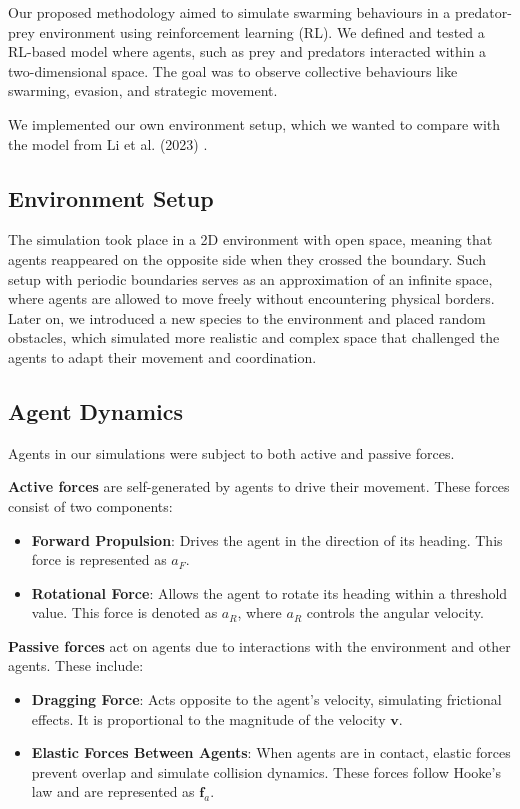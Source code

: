 \documentclass[9pt]{pnas-new}
\renewcommand{\vec}[1]{\ensuremath{\mathbf{#1}}}
\begin{document}
Our proposed methodology aimed to simulate swarming behaviours in a predator-prey environment using reinforcement learning (RL). 
We defined and tested a RL-based model where agents, such as prey and predators interacted within a two-dimensional space. The goal was to observe collective behaviours like swarming, evasion, and strategic movement.

We implemented our own environment setup, which we wanted to compare with the model from Li et al. (2023) \cite{li2023predator}.

\subsection{Environment Setup}
The simulation took place in a 2D environment with open space, meaning that agents reappeared on the opposite side when they crossed the boundary.
Such setup with periodic boundaries serves as an approximation of an infinite space, where agents are allowed to move freely without encountering physical borders. 
Later on, we introduced a new species to the environment and placed random obstacles, which simulated more realistic and complex space that challenged the agents to adapt their movement and coordination. 

\subsection{Agent Dynamics}
Agents in our simulations were subject to both active and passive forces.

\textbf{Active forces} are self-generated by agents to drive their movement. These forces consist of two components:
\begin{itemize}
	\item \textbf{Forward Propulsion}: Drives the agent in the direction of its heading. This force is represented as \( a_F \).
	\item \textbf{Rotational Force}: Allows the agent to rotate its heading within a threshold value. This force is denoted as \( a_R \), where \( a_R \) controls the angular velocity.
\end{itemize}

\textbf{Passive forces} act on agents due to interactions with the environment and other agents. These include:
\begin{itemize}
	\item \textbf{Dragging Force}: Acts opposite to the agent's velocity, simulating frictional effects. It is proportional to the magnitude of the velocity \( \vec{v} \).
	\item \textbf{Elastic Forces Between Agents}: When agents are in contact, elastic forces prevent overlap and simulate collision dynamics. These forces follow Hooke's law and are represented as \( \vec{f}_a \).
\end{itemize}
\end{document}
